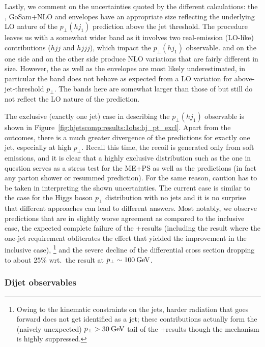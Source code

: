 Lastly, we comment on the uncertainties quoted by the different
calculations: the \Resbos, GoSam{}+\Sherpa NLO and \Minlo envelopes
have an appropriate size reflecting the underlying LO nature of the
$p_\perp(hj_1)$ prediction above the jet threshold. The \Loopsim
procedure leaves us with a somewhat wider band as it involves two
real-emission (LO-like) contributions ($hjj$ and $hjjj$), which impact
the $p_\perp(hj_1)$ observable.
\MGaMC and \Sherpa \MEPSatNLO on the one side and \Herwig on the other
side produce NLO variations that are fairly different in size.
However, the \Herwig as well as the \Powheg envelopes are most likely
underestimated, in particular the \Powheg band does not behave as
expected from a LO variation for above-jet-threshold $p_\perp$. The
\Sherpa \NNLOPS bands here are somewhat larger than those of \Powheg
but still do not reflect the LO nature of the prediction.

The exclusive (exactly one jet) case in describing the $p_\perp(hj_1)$
observable is shown in Figure~\ref{fig:hjetscomp:results:1obs:hj_pt_excl}.
Apart from the \NNLOPS outcomes, there is a much greater divergence of
the predictions for exactly one jet, especially at high $p_\perp$.
Recall this time, the recoil is generated only from soft emissions, and
it is clear that a highly exclusive distribution such as the one in
question serves as a stress test for the ME+PS as well as the \NNLOPS
predictions (in fact any parton shower or resummed prediction). For
the same reason, caution has to be taken in interpreting the shown
uncertainties. The current case is similar to the case for the Higgs
boson $p_\perp$ distribution with no jets and it is no surprise that
different approaches can lead to different answers. Most notably, we
observe \NNLOPS predictions that are in slightly worse agreement as
compared to the inclusive case, the expected complete failure of the
\GoSam{}+\Sherpa results (including the \Loopsim result where the
one-jet requirement obliterates the effect that yielded the
improvement in the inclusive case),%
\footnote{Owing to the kinematic constraints on the jets, harder
  radiation that goes forward does not get identified as a jet;
  these contributions actually form the (naively unexpected)
  $p_\perp>30\text{\:GeV}$ tail of the \GoSam{}+\Sherpa results though the
  mechanism is highly suppressed.}
and the severe decline of the \Herwig differential cross section
dropping to about 25\% wrt.~the \Powheg result at $p_\perp\sim100\text{\:GeV}$.



\subsubsection{Dijet observables}
\label{sec:hjetscomp:results:2jobs}

